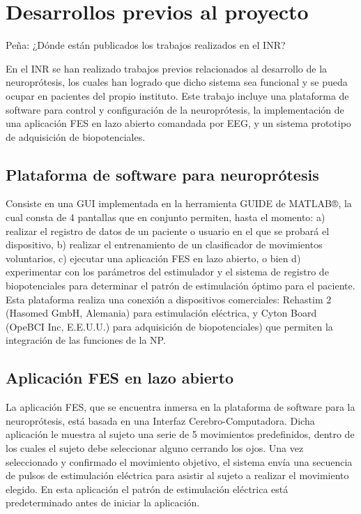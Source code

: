 \section{Desarrollos previos al proyecto}
{\color{red}Peña: ¿Dónde están publicados los trabajos realizados en el INR?}

En el INR se han realizado trabajos previos relacionados al desarrollo de la neuroprótesis, los cuales han logrado que dicho sistema sea funcional y se pueda ocupar en pacientes del propio instituto. Este trabajo incluye una plataforma de software para control y configuración de la neuroprótesis, la implementación de una aplicación FES en lazo abierto comandada por EEG, y un sistema prototipo de adquisición de biopotenciales.

\subsection{Plataforma de software para neuroprótesis}
Consiste en una GUI implementada en la herramienta GUIDE de MATLAB®, la cual consta de 4 pantallas que en conjunto permiten, hasta el momento: a) realizar el registro de datos de un paciente o usuario en el que se probará el dispositivo, b) realizar el entrenamiento de un clasificador de movimientos voluntarios, c) ejecutar una aplicación FES en lazo abierto, o bien d) experimentar con los parámetros del estimulador y el sistema de registro de biopotenciales para determinar el patrón de estimulación óptimo para el paciente. Esta plataforma realiza una conexión a dispositivos comerciales: Rehastim 2 (Hasomed GmbH, Alemania) para estimulación eléctrica, y Cyton Board (OpeBCI Inc, E.E.U.U.) para adquisición de biopotenciales) que permiten la integración de las funciones de la NP.

\subsection{Aplicación FES en lazo abierto}
La aplicación FES, que se encuentra inmersa en la plataforma de software para la neuroprótesis, está basada en una Interfaz Cerebro-Computadora. Dicha aplicación le muestra al sujeto una serie de 5 movimientos predefinidos, dentro de los cuales el sujeto debe seleccionar alguno cerrando los ojos. Una vez seleccionado y confirmado el movimiento objetivo, el sistema envía una secuencia de pulsos de estimulación eléctrica para asistir al sujeto a realizar el movimiento elegido. En esta aplicación el patrón de estimulación eléctrica está predeterminado antes de iniciar la aplicación.

